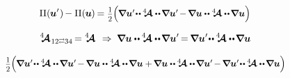 \[
\potential(\hspace{-0.1ex}\bm{u}'\hspace{.1ex}) \hspace{-0.2ex}
- \potential(\hspace{-0.1ex}\bm{u}\hspace{-0.1ex}) \hspace{-0.2ex}
= \smalldisplaystyleonehalf \hspace{-0.1ex} \scalebox{0.95}{$ \Bigl( \hspace{-0.1ex}
\boldnabla \bm{u}' \hspace{-0.4ex} \dotdotp \hspace{-0.1ex} \stiffnesstensor \dotdotp \hspace{-0.25ex} \boldnabla \bm{u}' \hspace{-0.25ex}
- \hspace{-0.2ex} \boldnabla \bm{u} \dotdotp \stiffnesstensor \dotdotp \hspace{-0.25ex} \boldnabla \bm{u}
\Bigr) $}
\]

\[
\stiffnesstensor_{\hspace{.12ex} 12 \scalebox{0.6}[0.8]{$\rightleftarrows$} 34} \hspace{-0.25ex} = \stiffnesstensor
\hspace{.4em}\Rightarrow\hspace{.25em}
\boldnabla \bm{u} \dotdotp \hspace{-0.1ex} \stiffnesstensor \dotdotp \hspace{-0.25ex} \boldnabla \bm{u}' \hspace{-0.25ex}
= \hspace{-0.2ex} \boldnabla \bm{u}' \hspace{-0.4ex} \dotdotp \hspace{-0.1ex} \stiffnesstensor \dotdotp \hspace{-0.25ex} \boldnabla \bm{u}
\]

\[
\smalldisplaystyleonehalf \hspace{-0.1ex} \scalebox{0.95}{$ \Bigl( \hspace{-0.1ex}
\boldnabla \bm{u}' \hspace{-0.4ex} \dotdotp \hspace{-0.1ex} \stiffnesstensor \dotdotp \hspace{-0.25ex} \boldnabla \bm{u}' \hspace{-0.25ex}
- \hspace{-0.2ex} \boldnabla \bm{u} \dotdotp \stiffnesstensor \dotdotp \hspace{-0.25ex} \boldnabla \bm{u}
+ \hspace{-0.2ex} \boldnabla \bm{u} \dotdotp \hspace{-0.1ex} \stiffnesstensor \dotdotp \hspace{-0.25ex} \boldnabla \bm{u}' \hspace{-0.25ex}
- \hspace{-0.2ex} \boldnabla \bm{u}' \hspace{-0.4ex} \dotdotp \hspace{-0.1ex} \stiffnesstensor \dotdotp \hspace{-0.25ex} \boldnabla \bm{u}
\Bigr) $}
\]

